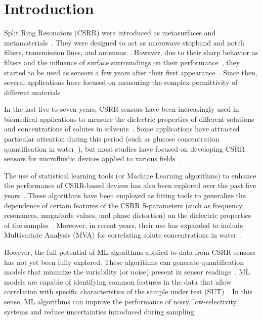 \documentclass[journal,twoside,web]{ieeecolor}
\begin{document}
\section{Introduction}
\label{sec:intro}
 Split Ring Resonators (CSRR) were introduced as metasurfaces and metamaterials~\cite{falcone2004, Baena2005}. They were designed to act as microwave stopband and notch filters, transmission lines, and antennas~\cite{GGarcia2005, Bonache2006, Mandal2006, Gil2007, Velez2008, Zhang2009}. However, due to their sharp behavior as filters and the influence of surface surroundings on their performance~\cite{Grzegorczyk2005, Stevanovic2006, Bonache2006}, they started to be used as sensors a few years after their first appearance~\cite{Boybay2012}. Since then, several applications have focused on measuring the complex permittivity of different materials~\cite{Song2013, Lee2014, Lee2014_2, Ansari2015, Standaert2017, Su2019}.

In the last five to seven years, CSRR sensors have been increasingly used in biomedical applications to measure the dielectric properties of different solutions and concentrations of solutes in solvents~\cite{Velez2018, Omer2021, Zhang2019}. Some applications have attracted particular attention during this period (such as glucose concentration quantification in water~\cite{Omer2021, Martinic2025}), but most studies have focused on developing CSRR sensors for microfluidic devices applied to various fields~\cite{Patel2022, Jiang2023, Liu2024, Zhang2024}.

The use of statistical learning tools (or Machine Learning algorithms) to enhance the performance of CSRR-based devices has also been explored over the past five years~\cite{Prakash2022, Harrison2020, Kazemi2022, Abdolrazzaghi2023}. These algorithms have been employed as fitting tools to generalize the dependence of certain features of the CSRR S-parameters (such as frequency resonances, magnitude values, and phase distortion)  on the dielectric properties of the samples~\cite{Martinic2025}. Moreover, in recent years, their use has expanded to include Multivariate Analysis (MVA) for correlating solute concentrations in water~\cite{Trovarello2024}.

However, the full potential of ML algorithms applied to data from CSRR sensors has not yet been fully explored. These algorithms can generate quantification models that minimize the variability (or noise) present in sensor readings~\cite{Mitchell1997, Wold1987, Wold2001, Nirmal2021}. ML models are capable of identifying common features in the data that allow correlation with specific characteristics of the sample under test (SUT)~\cite{Loutchanwot2022}. In this sense, ML algorithms can improve the performance of noisy, low-selectivity systems and reduce uncertainties introduced during sampling.
\end{document}
